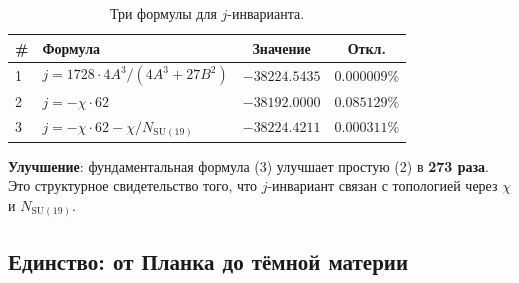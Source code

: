 \documentclass[11pt,a4paper]{article}
\newcommand{\SU}{\mathrm{SU}}
\theoremstyle{definition}
\begin{document}
\begin{table}[htbp]
\centering
\caption{Три формулы для $j$-инварианта.}
\label{tab:j-invariant-three}
\begin{tabular}{llcc}
\toprule
\# & Формула & Значение & Откл. \\
\midrule
1 & $j = 1728 \cdot 4A^{3}/(4A^{3} + 27B^{2})$ &
    $-38224.5435$ & $0.000009\%$ \\[0.3em]
2 & $j = -\chi \cdot 62$ &
    $-38192.0000$ & $0.085129\%$ \\[0.3em]
3 & $j = -\chi \cdot 62 - \chi/N_{\SU(19)}$ &
    $-38224.4211$ & $\mathbf{0.000311\%}$ \\
\bottomrule
\end{tabular}
\end{table}

\noindent
\textbf{Улучшение}: фундаментальная формула (3) улучшает простую (2)
в \textbf{273 раза}. Это структурное свидетельство того, что
$j$-инвариант связан с топологией через $\chi$ и $N_{\SU(19)}$.

\subsection{Единство: от Планка до тёмной материи}
\label{subsec:gravity-unity}
\end{document}

